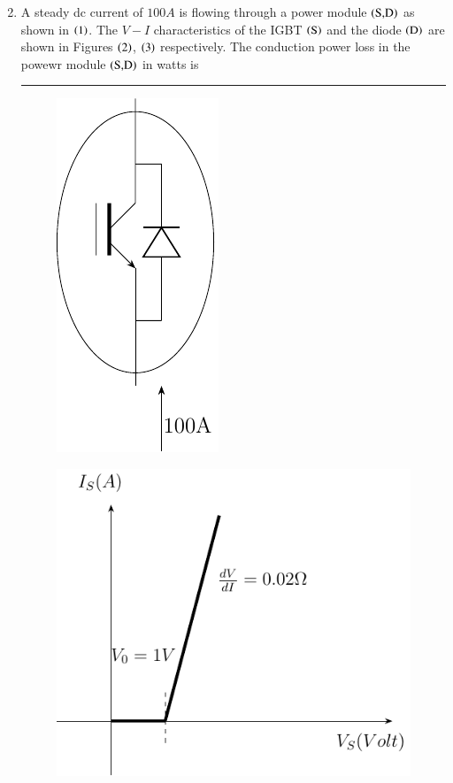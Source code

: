 \documentclass[journal]{IEEEtran}
\begin{document}
\begin{enumerate}
\begin{multicols}{2}
\begin{figure}[H]
			\caption{}
			\label{figure(b)}
		\end{figure}
	\end{multicols}
\item A steady dc current of $100A$ is flowing through a power module $\left(\text{S,D}\right)$ as shown in $\left(1\right)$. The $V-I$ characteristics of the IGBT $\left(\text{S}\right)$ and the diode $\left(\text{D}\right)$ are shown in Figures $\left(2\right)$, $\left(3\right)$ respectively. The conduction power loss in the powewr module $\left(\text{S,D}\right)$ in watts is \rule{2cm}{0.2pt}
		\begin{multicols}{3}
\begin{figure}[H]
			\centering
			\includegraphics[scale=0.5]{figs/q23-1.png}
			\caption{}
			\label{stemplot}
		\end{figure}
			\columnbreak
\begin{figure}[H]
			\centering
			\includegraphics[scale=0.5]{figs/q23-2.png}

\end{figure}
\end{multicols}
\end{enumerate}
\end{document}
